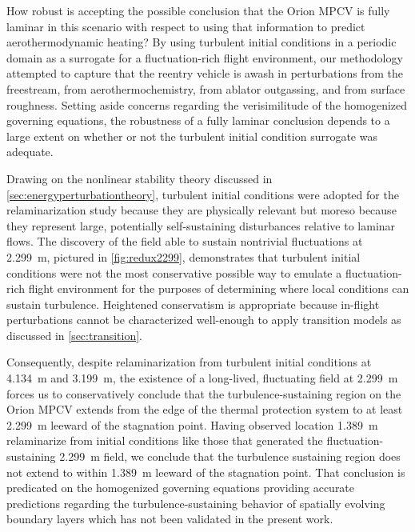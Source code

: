 How robust is accepting the possible conclusion that the Orion
MPCV is fully laminar in this scenario with respect to using that information to predict aerothermodynamic
heating?  By using turbulent initial conditions in a periodic domain as a
surrogate for a fluctuation-rich flight environment, our methodology attempted
to capture that the reentry vehicle is awash in perturbations from the
freestream, from aerothermochemistry, from ablator outgassing, and from surface
roughness.  Setting aside concerns regarding the verisimilitude of the
homogenized governing equations, the robustness of a fully laminar conclusion
depends to a large extent on whether or not the turbulent initial condition
surrogate was adequate.

Drawing on the nonlinear stability theory discussed in
\autoref{sec:energyperturbationtheory}, turbulent initial conditions were
adopted for the relaminarization study because they are physically relevant but
moreso because they represent large, potentially self-sustaining disturbances
relative to laminar flows.
%
The discovery of the field able to sustain nontrivial
fluctuations at 2.299~m, pictured in \autoref{fig:redux2299}, demonstrates that
turbulent initial conditions were not the most conservative possible way to
emulate a fluctuation-rich flight environment for the purposes of determining
where local conditions can sustain turbulence.  Heightened conservatism is appropriate
because in-flight perturbations cannot be characterized well-enough to apply
transition models as discussed in \autoref{sec:transition}.

Consequently, despite relaminarization from turbulent initial
conditions at 4.134~m and 3.199~m, the existence of a long-lived,
fluctuating field at 2.299~m forces us to conservatively conclude that
the turbulence-sustaining region on the Orion MPCV extends from the
edge of the thermal protection system to at least 2.299~m leeward of
the stagnation point.  Having observed location 1.389~m relaminarize
from initial conditions like those that generated the fluctuation-sustaining
2.299~m field,
we conclude that the turbulence
sustaining region does not extend to within 1.389~m leeward of the
stagnation point.  That conclusion is predicated on the
homogenized governing equations providing accurate predictions regarding
the turbulence-sustaining behavior of spatially evolving boundary layers
which has not been validated in the present work.

